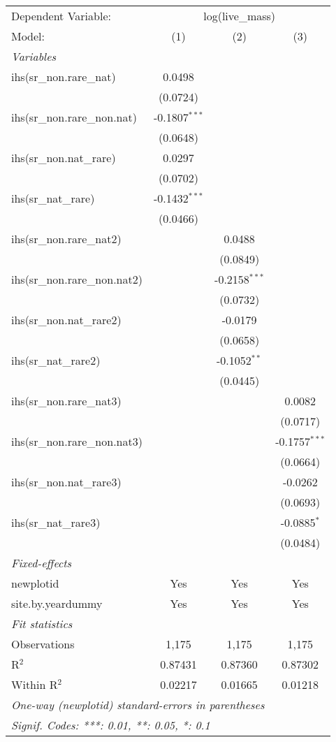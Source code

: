 \begin{tabular}{lccc}
\tabularnewline\midrule\midrule
Dependent Variable:&\multicolumn{3}{c}{log(live\_mass)}\\
Model:&(1) & (2) & (3)\\
\midrule \emph{Variables}&   &   &  \\
ihs(sr\_non.rare\_nat)&0.0498 &    &   \\
  &(0.0724) &    &   \\
ihs(sr\_non.rare\_non.nat)&-0.1807$^{***}$ &    &   \\
  &(0.0648) &    &   \\
ihs(sr\_non.nat\_rare)&0.0297 &    &   \\
  &(0.0702) &    &   \\
ihs(sr\_nat\_rare)&-0.1432$^{***}$ &    &   \\
  &(0.0466) &    &   \\
ihs(sr\_non.rare\_nat2)&   & 0.0488 &   \\
  &   & (0.0849) &   \\
ihs(sr\_non.rare\_non.nat2)&   & -0.2158$^{***}$ &   \\
  &   & (0.0732) &   \\
ihs(sr\_non.nat\_rare2)&   & -0.0179 &   \\
  &   & (0.0658) &   \\
ihs(sr\_nat\_rare2)&   & -0.1052$^{**}$ &   \\
  &   & (0.0445) &   \\
ihs(sr\_non.rare\_nat3)&   &    & 0.0082\\
  &   &    & (0.0717)\\
ihs(sr\_non.rare\_non.nat3)&   &    & -0.1757$^{***}$\\
  &   &    & (0.0664)\\
ihs(sr\_non.nat\_rare3)&   &    & -0.0262\\
  &   &    & (0.0693)\\
ihs(sr\_nat\_rare3)&   &    & -0.0885$^{*}$\\
  &   &    & (0.0484)\\
\midrule \emph{Fixed-effects}&   &   &  \\
newplotid & Yes & Yes & Yes\\
site.by.yeardummy & Yes & Yes & Yes\\
\midrule \emph{Fit statistics}&  & & \\
Observations & 1,175&1,175&1,175\\
R$^2$ & 0.87431&0.87360&0.87302\\
Within R$^2$ & 0.02217&0.01665&0.01218\\
\midrule\midrule\multicolumn{4}{l}{\emph{One-way (newplotid) standard-errors in parentheses}}\\
\multicolumn{4}{l}{\emph{Signif. Codes: ***: 0.01, **: 0.05, *: 0.1}}\\
\end{tabular}


